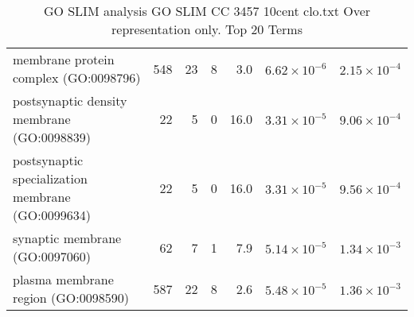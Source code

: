 \begin{table}[ht]
\begin{adjustbox}{width=\textwidth}
\begin{tabular}{lrrrrrr}
  membrane protein complex (GO:0098796) & 548 & 23 & 8 & 3.0 & $6.62 \times 10^{-6}$ & $2.15 \times 10^{-4}$ \\ 
  postsynaptic density membrane (GO:0098839) & 22 & 5 & 0 & 16.0 & $3.31 \times 10^{-5}$ & $9.06 \times 10^{-4}$ \\ 
  postsynaptic specialization membrane (GO:0099634) & 22 & 5 & 0 & 16.0 & $3.31 \times 10^{-5}$ & $9.56 \times 10^{-4}$ \\ 
  synaptic membrane (GO:0097060) & 62 & 7 & 1 & 7.9 & $5.14 \times 10^{-5}$ & $1.34 \times 10^{-3}$ \\ 
  plasma membrane region (GO:0098590) & 587 & 22 & 8 & 2.6 & $5.48 \times 10^{-5}$ & $1.36 \times 10^{-3}$ \\ 
   \hline
\end{tabular}
\end{adjustbox}
\caption{GO SLIM analysis GO SLIM CC 3457 10cent clo.txt Over representation only. Top 20 Terms} 
\label{tab:GO SLIM analysis GO SLIM CC 3457 10cent clo.txt Over representation only. Top 20 Terms}
\end{table}

